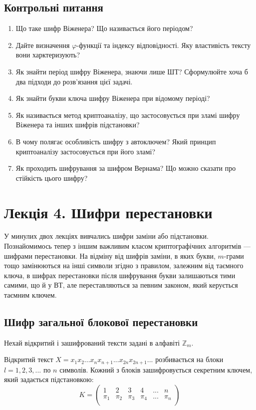 \subsection{Контрольні питання}
\begin{enumerate}
    \item Що таке шифр Віженера? Що називається його періодом?
    \item Дайте визначення $\varphi$-функції та індексу відповідності. Яку властивість тексту вони
    харктеризують?
    \item Як знайти період шифру Віженера, знаючи лише ШТ? Сформулюйте хоча б два підходи до
    розв’язання цієї задачі.
    \item Як знайти букви ключа шифру Віженера при відомому періоді?
    \item Як називається метод криптоаналізу, що застосовується при зламі шифру Віженера та інших
    шифрів підстановки?
    \item В чому полягає особливість шифру з автоключем? Який принцип криптоаналізу
    застосовується при його зламі?
    \item Як проходить шифрування за шифром Вернама? Що можно сказати про стійкість цього
    шифру?
\end{enumerate}

\section[Шифри перестановки]{Лекція 4. Шифри перестановки}

У минулих двох лекціях вивчались шифри заміни або підстановки.
Познайомимось тепер з іншим важливим класом криптографічних алгоритмів
--- шифрами перестановки. На відміну від шифрів заміни, в яких букви, $m$-грами
тощо замінюються на інші символи згідно з правилом, залежним від таємного
ключа, в шифрах перестановки після шифрування букви залишаються тими
самими, що й у ВТ, але переставляються за певним законом, який керується
таємним ключем.

\subsection{Шифр загальної блокової перестановки}

Нехай відкритий і зашифрований тексти задані в алфавіті $\mathbb{Z}_m$.

Відкритий текст
$X = x_1 x_2 ... x_n x_{n+1} ... x_{2n} x_{2n+1} ...$
розбивається на блоки
$l = 1, 2, 3, ...$ по $n$ символів. Кожний з блоків зашифровується секретним
ключем, який задається підстановкою:
\begin{equation}
    K = \begin{pmatrix}
        1     & 2     & 3     & 4     & ... & n     \\
        \pi_1 & \pi_2 & \pi_3 & \pi_4 & ... & \pi_n \\
    \end{pmatrix}
\end{equation}

